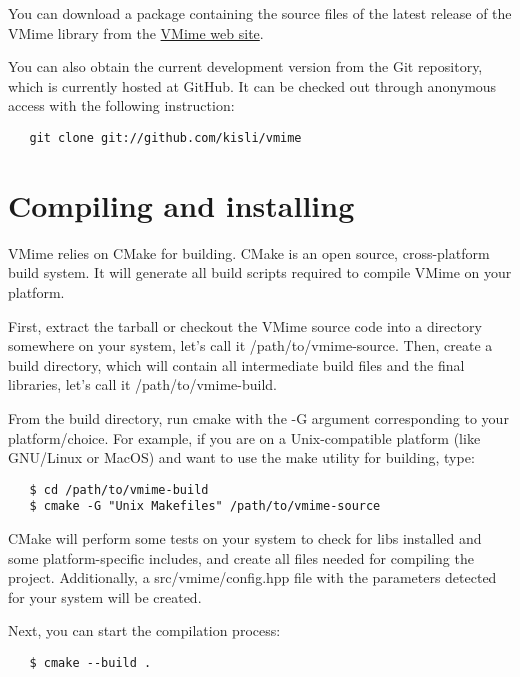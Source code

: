 You can download a package containing the source files of the latest release
of the VMime library from the \href{http://www.vmime.org/}{VMime web site}.

You can also obtain the current development version from the Git repository,
which is currently hosted at GitHub. It can be checked out through anonymous
access with the following instruction:

\begin{verbatim}
   git clone git://github.com/kisli/vmime
\end{verbatim}

\section{Compiling and installing}

VMime relies on CMake for building. CMake is an open source, cross-platform
build system. It will generate all build scripts required to compile VMime on
your platform.

First, extract the tarball or checkout the VMime source code into a directory
somewhere on your system, let's call it {\vcode /path/to/vmime-source}. Then,
create a build directory, which will contain all intermediate build files and
the final libraries, let's call it {\vcode /path/to/vmime-build}.

From the build directory, run {\vcode cmake} with the {\vcode -G} argument
corresponding to your platform/choice. For example, if you are on a
Unix-compatible platform (like GNU/Linux or MacOS) and want to use the
{\vcode make} utility for building, type:

\begin{verbatim}
   $ cd /path/to/vmime-build
   $ cmake -G "Unix Makefiles" /path/to/vmime-source
\end{verbatim}

CMake will perform some tests on your system to check for libs installed
and some platform-specific includes, and create all files needed for
compiling the project. Additionally, a {\vcode src/vmime/config.hpp} file
with the parameters detected for your system will be created.

Next, you can start the compilation process:

\begin{verbatim}
   $ cmake --build .
\end{verbatim}

